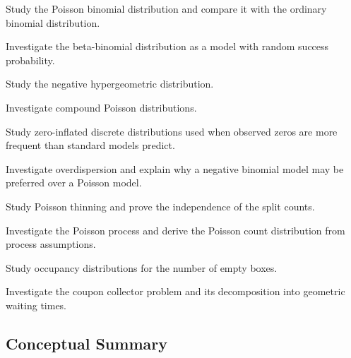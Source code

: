 \begin{exercise}[4]
Study the Poisson binomial distribution and compare it with the ordinary
binomial distribution.
\end{exercise}

\begin{exercise}[4]
Investigate the beta-binomial distribution as a model with random
success probability.
\end{exercise}

\begin{exercise}[4]
Study the negative hypergeometric distribution.
\end{exercise}

\begin{exercise}[4]
Investigate compound Poisson distributions.
\end{exercise}

\begin{exercise}[4]
Study zero-inflated discrete distributions used when observed zeros are
more frequent than standard models predict.
\end{exercise}

\begin{exercise}[4]
Investigate overdispersion and explain why a negative binomial model may
be preferred over a Poisson model.
\end{exercise}

\begin{exercise}[4]
Study Poisson thinning and prove the independence of the split counts.
\end{exercise}

\begin{exercise}[4]
Investigate the Poisson process and derive the Poisson count
distribution from process assumptions.
\end{exercise}

\begin{exercise}[4]
Study occupancy distributions for the number of empty boxes.
\end{exercise}

\begin{exercise}[4]
Investigate the coupon collector problem and its decomposition into
geometric waiting times.
\end{exercise}

\subsection{Conceptual Summary}
\label{subsec:discrete-distributions-summary}

